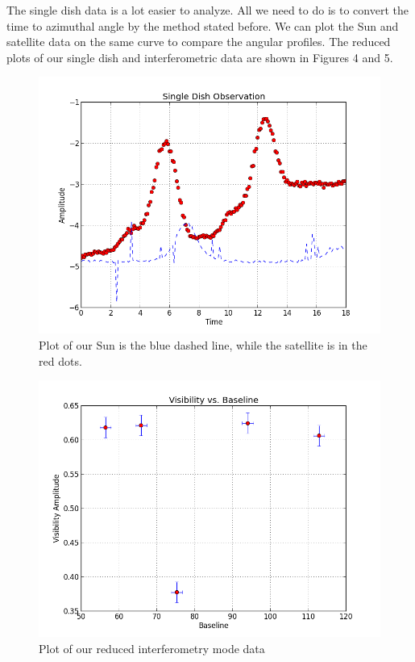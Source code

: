 \documentclass{aastex61}
\begin{document}
The single dish data is a lot easier to analyze. All we need to do is to convert the time to azimuthal angle by the method stated before. We can plot the Sun and satellite data on the same curve to compare the angular profiles.
The reduced plots of our single dish and interferometric data are shown in Figures 4 and 5.


\begin{figure}[hbt!]
	\centering
	\includegraphics[scale = .45]{krennic.png}
	\caption{Plot of our Sun is the blue dashed line, while the satellite is in the red dots.}
	\label{fig: refcurve1}
\end{figure}
\begin{figure}[hbt!]
	\centering
	\includegraphics[scale = .45]{jyn.png}
	\caption{Plot of our reduced interferometry mode data}
	\label{fig: refcurve1}
\end{figure}
\end{document}

